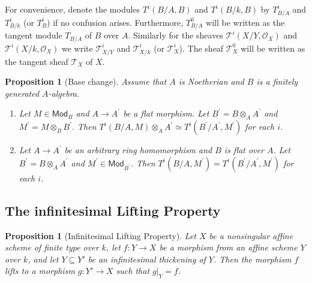\documentclass{article}
\newtheorem{proposition}[theorem]{Proposition}
\theoremstyle{definition}
\begin{document}
For convenience, denote the modules \(T^{i}(B / A,B)\) and \(T^{i}(B / k,B)\) by \(T_{B / A}^{i}\) and \(T_{B / k}^{i}\) (or \(T_{B}^{i}\)) if no confusion arises. Furthermore, \(T_{B / A}^{0}\) will be written as the tangent module \(T_{B / A}\) of \(B\) over \(A\). Similarly for the sheaves \(\mathcal{T}^{i}(X / Y,\mathcal{O}_{X})\) and \(\mathcal{T}^{i}(X / k,\mathcal{O}_{X})\) we write \(\mathcal{T}_{X / Y}^{i}\) and \(\mathcal{T}_{X / k}^{i}\) (or \(\mathcal{T}_{X}^{i}\)). The sheaf \(\mathcal{T}_{X}^{0}\) will be written as the tangent sheaf \(\mathcal{T}_{X}\) of \(X\).

\begin{proposition}[Base change]
Assume that \(A\) is Noetherian and \(B\) is a finitely generated \(A\)-algebra.
\begin{enumerate}
\item Let \(M\in \mathsf{Mod}_{B}\) and \(A\to A^{\prime}\) be a flat morphism. Let \(B^{\prime} = B\otimes_{A}A^{\prime}\) and \(M^{\prime} = M\otimes_{B}B^{\prime}\). Then \(T^{i}(B / A,M)\otimes_{A}A^{\prime}\simeq T^{i}(B^{\prime} / A^{\prime},M^{\prime})\) for each \(i\).
\item Let \(A \to A^{\prime}\) be an arbitrary ring homomorphism and \(B\) is flat over \(A\). Let \(B^{\prime} = B\otimes_{A}A^{\prime}\) and \(M^{\prime}\in \mathsf{Mod}_{B^{\prime}}\). Then \(T^{i}(B / A, M^{\prime}) = T^{i}(B^{\prime} / A^{\prime}, M^{\prime})\) for each \(i\).
\end{enumerate}
\end{proposition}

\subsection{The infinitesimal Lifting Property}

\begin{proposition}[Infinitesimal Lifting Property]
Let \(X\) be a nonsingular affine scheme of finite type over \(k\), let \(f: Y \to X\) be a morphism from an affine scheme \(Y\) over \(k\), and let \(Y \subseteq Y'\) be an infinitesimal thickening of \(Y\). Then the morphism \(f\) lifts to a morphism \(g: Y' \to X\) such that \(g|_{Y} = f\).
\end{proposition}
\end{document}
